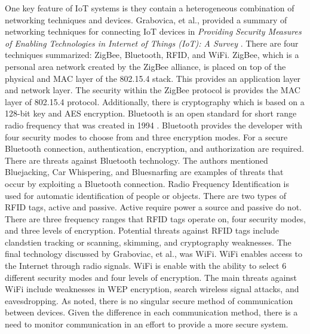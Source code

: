 \documentclass[../main.tex]{subfiles}
\begin{document}
One key feature of IoT systems is they contain a heterogeneous combination of networking techniques and devices. Grabovica, et al., provided a summary of networking techniques for connecting IoT devices in \textit{Providing Security Measures of Enabling Technologies in Internet of Things (IoT): A Survey} \cite{7513647}. There are four techniques summarized: ZigBee, Bluetooth, RFID, and WiFi. ZigBee, which is a personal area network created by the ZigBee alliance, is placed on top of the physical and MAC layer of the 802.15.4 stack. This provides an application layer and network layer. The security within the ZigBee protocol is provides the MAC layer of 802.15.4 protocol. Additionally, there is cryptography which is based on a 128-bit key and AES encryption. Bluetooth is an open standard for short range radio frequency that was created in 1994 \cite{bluetooth}. Bluetooth provides the developer with four security modes to choose from and three encryption modes. For a secure Bluetooth connection, authentication, encryption, and authorization are required. There are threats against Bluetooth technology. The authors mentioned Bluejacking, Car Whispering, and Bluesnarfing are examples of threats that occur by exploiting a Bluetooth connection. Radio Frequency Identification  is used for automatic identification of people or objects. There are two types of RFID tags, active and passive. Active require power a source and passive do not. There are three frequency ranges that RFID tags operate on, four security modes, and three levels of encryption. Potential threats against RFID tags include clandstien tracking or scanning, skimming, and cryptography weaknesses. The final technology discussed by Graboviac, et al., was WiFi. WiFi enables access to the Internet through radio signals. WiFi is enable with the ability to select 6 different security modes and four levels of encryption. The main threats against WiFi include weaknesses in WEP encryption, search wireless signal attacks, and eavesdropping. As noted, there is no singular secure method of communication between devices. Given the difference in each communication method, there is a need to monitor communication in an effort to provide a more secure system.   
\end{document}
